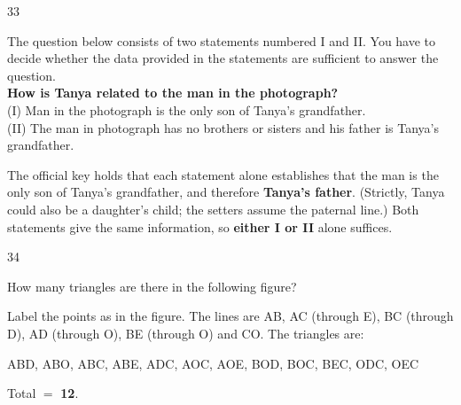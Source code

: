 \begin{question}{33}
{The question below consists of two statements numbered I and II. You have to decide whether the data provided in the statements are sufficient to answer the question.\\
\textbf{How is Tanya related to the man in the photograph?}\\
(I) Man in the photograph is the only son of Tanya's grandfather.\\
(II) The man in photograph has no brothers or sisters and his father is Tanya's grandfather.\par}
\begin{explain}
The official key holds that each statement alone establishes that the man is the only son of Tanya's grandfather, and therefore \textbf{Tanya's father}. (Strictly, Tanya could also be a daughter's child; the setters assume the paternal line.) Both statements give the same information, so \textbf{either I or II} alone suffices.
\end{explain}
\end{question}

\begin{question}{34}
{How many triangles are there in the following figure?\par}
\begin{explain}
Label the points as in the figure. The lines are AB, AC (through E), BC (through D), AD (through O), BE (through O) and CO. The triangles are:
\begin{center}\small
ABD, ABO, ABC, ABE, ADC, AOC, AOE, BOD, BOC, BEC, ODC, OEC
\end{center}
Total $=$ \textbf{12}.
\end{explain}
\end{question}

